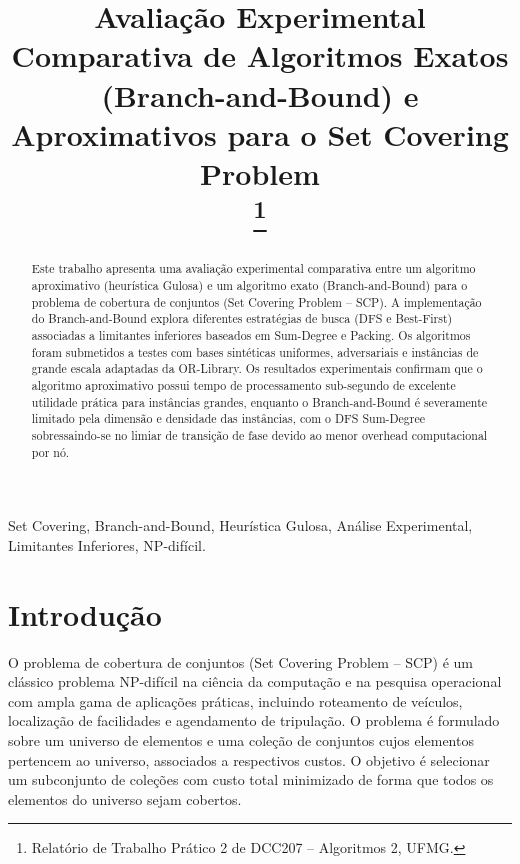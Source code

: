 \documentclass[conference]{IEEEtran}
\begin{document}
\title{Avaliação Experimental Comparativa de Algoritmos Exatos (Branch-and-Bound) e Aproximativos para o Set Covering Problem\\
\thanks{Relatório de Trabalho Prático 2 de DCC207 -- Algoritmos 2, UFMG.}
}

\author{
}

\maketitle

\begin{abstract}
Este trabalho apresenta uma avaliação experimental comparativa entre um algoritmo aproximativo (heurística Gulosa) e um algoritmo exato (Branch-and-Bound) para o problema de cobertura de conjuntos (Set Covering Problem -- SCP). A implementação do Branch-and-Bound explora diferentes estratégias de busca (DFS e Best-First) associadas a limitantes inferiores baseados em Sum-Degree e Packing. Os algoritmos foram submetidos a testes com bases sintéticas uniformes, adversariais e instâncias de grande escala adaptadas da OR-Library. Os resultados experimentais confirmam que o algoritmo aproximativo possui tempo de processamento sub-segundo de excelente utilidade prática para instâncias grandes, enquanto o Branch-and-Bound é severamente limitado pela dimensão e densidade das instâncias, com o DFS Sum-Degree sobressaindo-se no limiar de transição de fase devido ao menor overhead computacional por nó.
\end{abstract}

\begin{IEEEkeywords}
Set Covering, Branch-and-Bound, Heurística Gulosa, Análise Experimental, Limitantes Inferiores, NP-difícil.
\end{IEEEkeywords}

\section{Introdução}
O problema de cobertura de conjuntos (Set Covering Problem -- SCP) é um clássico problema NP-difícil na ciência da computação e na pesquisa operacional com ampla gama de aplicações práticas, incluindo roteamento de veículos, localização de facilidades e agendamento de tripulação. O problema é formulado sobre um universo de elementos e uma coleção de conjuntos cujos elementos pertencem ao universo, associados a respectivos custos. O objetivo é selecionar um subconjunto de coleções com custo total minimizado de forma que todos os elementos do universo sejam cobertos.
\end{document}
